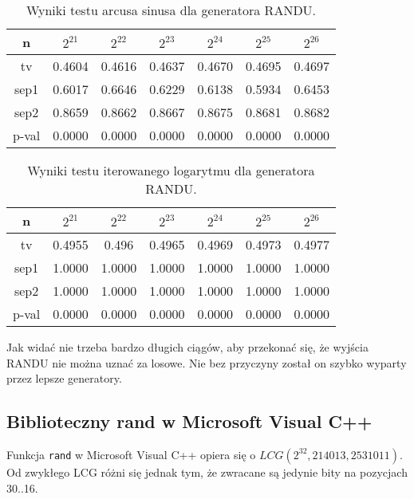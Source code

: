 \documentclass[a4paper,11pt,twoside]{book}
\theoremstyle{definition}
\begin{document}
\begin{table}[ht!]
\centering
 \caption{Wyniki testu arcusa sinusa dla generatora RANDU.}
 \label{tab:randu_asin}
\begin{tabular} {||c|c|c|c|c|c|c||}  
 \hline 
     n &  $2^{21}$ &  $2^{22}$ &  $2^{23}$ &  $2^{24}$ &  $2^{25}$ &  $2^{26}$\\ \hline
     tv &  0.4604 &  0.4616 &  0.4637 &  0.4670 &  0.4695 &  0.4697\\ \hline
   sep1 &  0.6017 &  0.6646 &  0.6229 &  0.6138 &  0.5934 &  0.6453\\ \hline
   sep2 &  0.8659 &  0.8662 &  0.8667 &  0.8675 &  0.8681 &  0.8682\\ \hline
  p-val &  0.0000 &  0.0000 &  0.0000 &  0.0000 &  0.0000 &  0.0000\\ \hline
\end{tabular}  
\end{table}

\begin{table}[ht!]
\centering
 \caption{Wyniki testu iterowanego logarytmu dla generatora RANDU.}
 \label{tab:randu_lil}
\begin{tabular} {||c|c|c|c|c|c|c||}  
 \hline 
     n &  $2^{21}$ &  $2^{22}$ &  $2^{23}$ &  $2^{24}$ &  $2^{25}$ &  $2^{26}$\\ \hline
     tv &  0.4955 &   0.496 &  0.4965 &  0.4969 &  0.4973 &  0.4977\\ \hline
   sep1 &  1.0000 &  1.0000 &  1.0000 &  1.0000 &  1.0000 &  1.0000\\ \hline
   sep2 &  1.0000 &  1.0000 &  1.0000 &  1.0000 &  1.0000 &  1.0000\\ \hline
  p-val &  0.0000 &  0.0000 &  0.0000 &  0.0000 &  0.0000 &  0.0000\\ \hline
\end{tabular}  
\end{table}

Jak widać nie trzeba bardzo długich ciągów, aby przekonać się, że wyjścia RANDU nie można uznać za losowe. Nie bez przyczyny został on szybko wyparty przez lepsze generatory.

\FloatBarrier
\subsection{Biblioteczny rand w Microsoft Visual C++}
Funkcja \texttt{rand} w Microsoft Visual C++ opiera się o $LCG(2^{32}, 214013, 2531011)$. Od zwykłego LCG różni się jednak tym, że zwracane są jedynie bity na pozycjach 30..16. 
\end{document}
